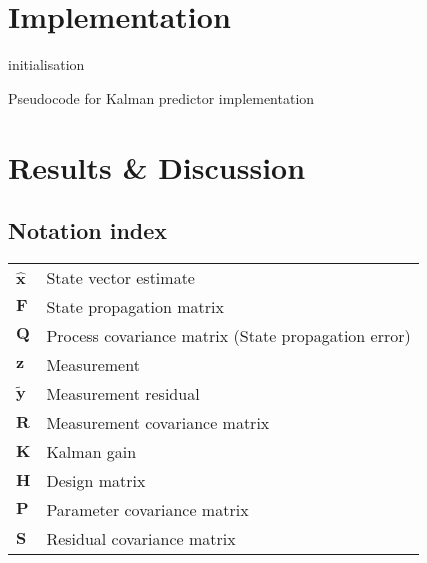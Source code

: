 \documentclass[12pt]{article}
\begin{document}
\section{Implementation}

\begin{algorithm}[H]
 initialisation\;

 \caption{Pseudocode for Kalman predictor implementation}
\end{algorithm}

\section{Results \& Discussion}

\newpage
\begin{appendices}

\section{Notation index}
\begin{tabular}{ll}
$\hat{\mathbf{x}}$   & State vector estimate \\
$\mathbf{F}$         & State propagation matrix \\
$\mathbf{Q}$         & Process covariance matrix (State propagation error) \\
$\mathbf{z}$         & Measurement \\
$\tilde{\mathbf{y}}$ & Measurement residual \\
$\mathbf{R}$         & Measurement covariance matrix \\
$\mathbf{K}$         & Kalman gain \\
$\mathbf{H}$         & Design matrix \\
$\mathbf{P}$         & Parameter covariance matrix \\
$\mathbf{S}$         & Residual covariance matrix \\
\end{tabular}

\end{appendices}
\end{document}
